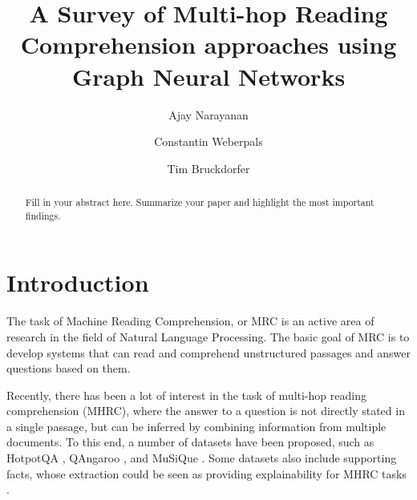 \documentclass[sigplan,screen]{acmart}
\begin{document}
\title{A Survey of Multi-hop Reading Comprehension approaches using Graph Neural Networks}

\author{Ajay Narayanan}

\author{Constantin Weberpals}

\author{Tim Bruckdorfer}



\begin{abstract}
  Fill in your abstract here. Summarize your paper and highlight the most important findings.
\end{abstract}

\maketitle

\section{Introduction}
The task of Machine Reading Comprehension, or MRC is an active area of research in the field of Natural Language Processing. 
The basic goal of MRC is to develop systems that can read and comprehend unstructured passages and answer questions based on them. 

Recently, there has been a lot of interest in the task of multi-hop reading comprehension (MHRC), where the answer to a question is not 
directly stated in a single passage, but can be inferred by combining information from multiple documents. To this end, a number of datasets 
have been proposed, such as HotpotQA \cite{RN116}, QAngaroo \cite{RN115}, and MuSiQue \cite{RN167}. Some datasets also include supporting 
facts, whose extraction could be seen as providing explainability for MHRC tasks  \cite{RN116} \cite{RN106}.
\end{document}
